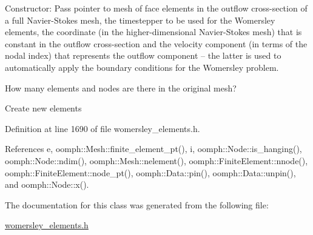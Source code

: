 Constructor\+: Pass pointer to mesh of face elements in the outflow cross-\/section of a full Navier-\/\+Stokes mesh, the timestepper to be used for the Womersley elements, the coordinate (in the higher-\/dimensional Navier-\/\+Stokes mesh) that is constant in the outflow cross-\/section and the velocity component (in terms of the nodal index) that represents the outflow component -- the latter is used to automatically apply the boundary conditions for the Womersley problem. 

How many elements and nodes are there in the original mesh?

Create new elements 

Definition at line 1690 of file womersley\+\_\+elements.\+h.



References e, oomph\+::\+Mesh\+::finite\+\_\+element\+\_\+pt(), i, oomph\+::\+Node\+::is\+\_\+hanging(), oomph\+::\+Node\+::ndim(), oomph\+::\+Mesh\+::nelement(), oomph\+::\+Finite\+Element\+::nnode(), oomph\+::\+Finite\+Element\+::node\+\_\+pt(), oomph\+::\+Data\+::pin(), oomph\+::\+Data\+::unpin(), and oomph\+::\+Node\+::x().



The documentation for this class was generated from the following file\+:\begin{DoxyCompactItemize}
\item 
\hyperlink{womersley__elements_8h}{womersley\+\_\+elements.\+h}\end{DoxyCompactItemize}

